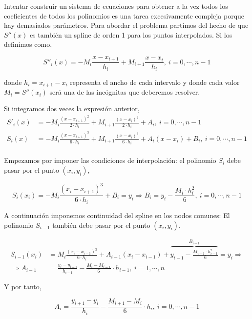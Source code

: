 Intentar construir un sistema de ecuaciones para obtener a la vez todos los coeficientes de todos los polinomios es una tarea excesivamente compleja porque hay demasiados parámetros.  Para abordar el problema partimos del hecho de que $S''(x)$ es también un spline de orden 1 para los puntos interpolados. Si los definimos como,

\begin{equation*}
S''_i(x)=-M_i\frac{x-x_{i+1}}{h_i}+M_{i+1}\frac{x-x_i}{h_i},\   i=0,\cdots, n-1
\end{equation*}

donde $h_i=x_{i+1}-x_i$ representa el ancho de cada intervalo y donde cada valor $M_i=S''(x_i)$ será una de las incógnitas que deberemos resolver.

Si integramos dos veces la expresión anterior,
\begin{align*}
S'_i(x)&=-M_i\frac{(x-x_{i+1})^2}{2\cdot h_i}+M_{i+1}\frac{(x-x_i)^2}{2\cdot h_i}+A_i,\   i=0,\cdots, n-1\\
S_i(x)&=-M_i\frac{(x-x_{i+1})^3}{6\cdot h_i}+M_{i+1}\frac{(x-x_i)^3}{6\cdot h_i}+A_i(x-x_i)+B_i,\   i=0,\cdots, n-1\\
\end{align*}

Empezamos por imponer las condiciones de interpolación: el polinomio $S_i$ debe pasar por el punto $(x_i,y_i)$,

\begin{equation*}
S_i(x_i)=-M_i\frac{(x_i-x_{i+1})^3}{6\cdot h_i}+B_i=y_i \Rightarrow B_i=y_i-\frac{M_i\cdot h_i^2}{6},\ i=0,\cdots, n-1
\end{equation*}

A continuación imponemos continuidad del spline en los nodos comunes: El polinomio $S_{i-1}$ también debe pasar por el punto $(x_i, y_i)$,

\begin{align*}
S_{i-1}(x_i)&=M_i\frac{(x_i-x_{i-1})^3}{6\cdot h_i}+A_{i-1}(x_i-x_{i-1})+\overbrace{y_{i-1}-\frac{M_{i-1}\cdot h_{i-1}^2}{6}}^{B_{i-1}}=y_i \Rightarrow\\
\Rightarrow A_{i-1}&=\frac{y_i-y_{i-1}}{h_{i-1}}-\frac{M_i-M_{i-1}}{6}\cdot h_{i-1}, \ i=1,\cdots, n
\end{align*}

Y por tanto,

\begin{equation*}
A_i=\frac{y_{i+1}-y_i}{h_i}-\frac{M_{i+1}-M_i}{6}\cdot h_i, \ i=0,\cdots, n-1
\end{equation*}

